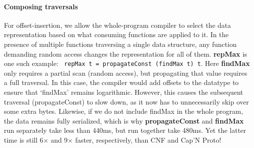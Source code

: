 \documentclass[showabstract,showacknowledgments,showpreface,showdedication]{iuphd}
\theoremstyle{nonumberplain}
\newcommand{\il}[1]{\lstinline[style=inline,mathescape=true];#1;}
\begin{document}
\paragraph{Composing traversals}

For offset-insertion, we allow the whole-program compiler to select the data
representation based on what consuming functions are applied to it.
In the presence of multiple functions traversing a single data structure,
any function demanding random access changes the representation for all of them.
{\bf repMax} is one such example:
\il{ repMax t = propagateConst (findMax t) t}.
Here {\bf findMax} only requires a partial scan (random access), but propagating
that value requires a full traversal.  In this case, the compiler would add
offsets to the datatype to ensure that `findMax' remains
logarithmic.
%
However, this causes the subsequent traversal (propagateConst) to slow
down, as it now has to unnecessarily skip over some extra bytes.  Likewise, if
we do not include findMax in the whole program, the data remains fully
serialized, which is why {\bf propagateConst} and {\bf findMax} run separately
take less than 440ms, but run together take 480ms.  Yet the latter time is still
6$\times$ and 9$\times$ faster, respectively, than CNF and Cap'N Proto!
      
\end{document}
